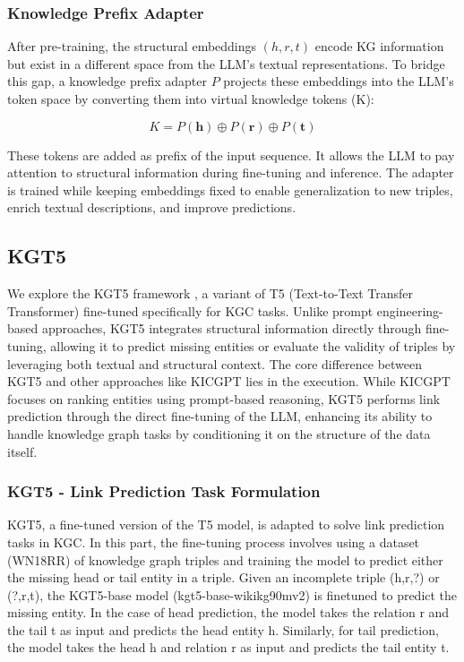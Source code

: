 \documentclass[12pt,a4paper]{article}
\begin{document}
\subsubsection{Knowledge Prefix Adapter}
After pre-training, the structural embeddings \((h, r, t)\) encode
KG information but exist in a different space from the LLM's textual
representations. To bridge this gap, a knowledge prefix adapter \(P\)
projects these embeddings into the LLM's token space by converting
them into virtual knowledge tokens (K):

\begin{equation}
    K = P(\mathbf{h}) \oplus P(\mathbf{r}) \oplus P(\mathbf{t})
\end{equation}

These tokens are added as prefix of the input sequence. It allows
the LLM to pay attention to structural information during fine-tuning
and inference. The adapter is trained while keeping embeddings
fixed to enable generalization to new triples, enrich textual
descriptions, and improve predictions.

\subsection{KGT5}
We explore the KGT5 framework \cite{wei2023kicgpt}, a variant of T5 (Text-to-Text Transfer Transformer) fine-tuned specifically for KGC tasks. Unlike prompt engineering-based approaches, KGT5 integrates structural information directly through fine-tuning, allowing it to predict missing entities or evaluate the validity of triples by leveraging both textual and structural context. The core difference between KGT5 and other approaches like KICGPT lies in the execution. While KICGPT focuses on ranking entities using prompt-based reasoning, KGT5 performs link prediction through the direct fine-tuning of the LLM, enhancing its ability to handle knowledge graph tasks by conditioning it on the structure of the data itself.

\subsubsection{KGT5 - Link Prediction Task Formulation} 
KGT5, a fine-tuned version of the T5 model, is adapted to solve link prediction tasks in KGC. In this part, the fine-tuning process involves using a dataset (WN18RR) of knowledge graph triples and training the model to predict either the missing head or tail entity in a triple\cite{yao2023exploring}. Given an incomplete triple (h,r,?) or (?,r,t), the KGT5-base model (kgt5-base-wikikg90mv2) is finetuned to predict the missing entity. In the case of head prediction, the model takes the relation r and the tail t as input and predicts the head entity h. Similarly, for tail prediction, the model takes the head h and relation r as input and predicts the tail entity t.
\end{document}
